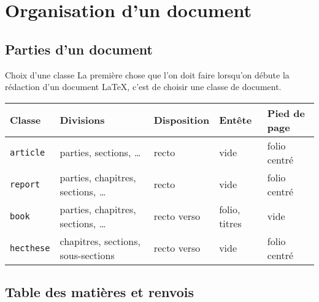 
\section{Organisation d'un document}

\subsection{Parties d'un document}

\begin{frame}[c]{Choix d'une classe}
	La première chose que l'on doit faire lorsqu'on débute la rédaction d'un document \LaTeX,
	c'est de choisir une classe de document.
	
	\begin{table}[c]
		\begin{tabularx}{\textwidth}{lllll}
			\hline\hline
			\textbf{Classe} & \textbf{Divisions} & \textbf{Disposition} & \textbf{Entête} &	\textbf{Pied de page} \\
			\hline
			\texttt{article}			&	parties, sections, \ldots				&	recto		&	vide			&	folio centré \\
			\texttt{report}				&	parties, chapitres, sections, \ldots	&	recto		&	vide			&	folio centré \\
			\texttt{book}				&	parties, chapitres, sections, \ldots	&	recto verso	&
			folio, titres	&	vide \\
			\texttt{hecthese}	&	chapitres, sections, sous-sections		&	recto verso	&
			vide			&	folio centré \\
			\hline\hline
		\end{tabularx}
	\end{table}
\end{frame}

\subsection{Table des matières et renvois}